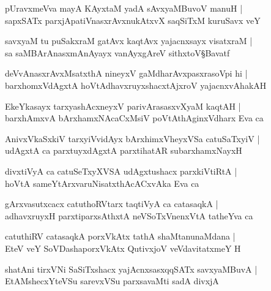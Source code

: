 \begin{shloka}
pUravxmeVva mayA KAyxtaM yadA sAvxyaMBuvoV manuH |\\
sapxSATx parxjApatiVnasxrAvxnukAtxvX saqSiTxM kuruSavx veY
\end{shloka}

\begin{shloka}
savxyaM tu puSakxraM gatAvx kaqtAvx yajacnxsayx visatxraM |\\
sa saMBArAnasxmAnAyayx vanAyxgAreV sithxtoV\S Bavatf 
\end{shloka}

\begin{shloka}
deVvAnasxrAvxMsatxthA nineyxV gaMdharAvxpasxrasoVpi hi |\\
barxhomxVdAgxtA hoVtAdhavxruyxshacxtAjxroV yajacnxvAhakAH
\end{shloka}

\begin{shloka}
EkeYkasayx tarxyashAcxneyxV parivArasasxvXyaM kaqtAH |\\
barxhAmxvA bArxhamxNAcaCxMsiV poVtAthAginxVdharx Eva ca
\end{shloka}

\begin{shloka}
AnivxVkaSxkiV tarxyiVvidAyx bArxhimxVheyxVSa catuSaTxyiV |\\
udAgxtA ca parxtuyxdAgxtA parxtihatAR subarxhamxNayxH 
\end{shloka}

\begin{shloka}
divxtiVyA ca catuSeTxyXVSA udAgxtushacx parxkiVtiRtA |\\
hoVtA sameYtArxvaruNisatxthAcACxvAka Eva ca 
\end{shloka}

\begin{shloka}
gArxvasutxcacx catuthoRVtarx taqtiVyA ca catasaqkA |\\
adhavxruyxH parxtiparxsAthxtA neVSoTxVnenxVtA tatheYva ca
\end{shloka}

\begin{shloka}
catuthiRV catasaqkA porxVkAtx tathA shaMtanunaMdana |\\
EteV veY SoVDashaporxVkAtx QutivxjoV veVdavitatxmeY H
\end{shloka}

\begin{shloka}
shatAni tirxVNi SaSiTxshacx yajAcnxsasxqqSATx savxyaMBuvA |\\
EtAMshecxYteVSu sarevxVSu parxsavaMti sadA divxjA\R
\end{shloka}

